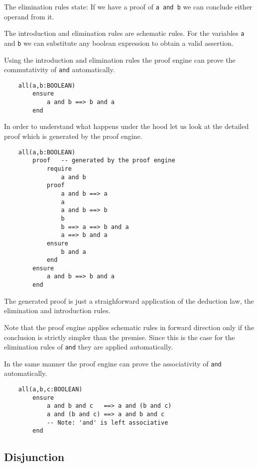 The elimination rules state: If we have a proof of \lstinline!a and b! we can conclude
either operand from it.

The introduction and elimination rules are schematic rules. For the variables
\lstinline!a! and \lstinline!b! we can substitute any boolean expression to obtain a valid
assertion.

Using the introduction and elimination rules the proof engine can prove the
commutativity of \lstinline!and! automatically.

\begin{lstlisting}
    all(a,b:BOOLEAN)
        ensure
            a and b ==> b and a
        end
\end{lstlisting}

In order to understand what happens under the hood let us look at the detailed
proof which is generated by the proof engine.

\begin{lstlisting}
    all(a,b:BOOLEAN)
        proof   -- generated by the proof engine
            require
                a and b
            proof
                a and b ==> a
                a
                a and b ==> b
                b
                b ==> a ==> b and a
                a ==> b and a
            ensure
                b and a
            end
        ensure
            a and b ==> b and a
        end
\end{lstlisting}

The generated proof is just a straighforward application of the deduction law,
the elimination and introduction rules.

Note that the proof engine applies schematic rules in forward direction only
if the conclusion is strictly simpler than the premise. Since this is the case
for the elimination rules of \lstinline!and! they are applied automatically.

In the same manner the proof engine can prove the associativity of
\lstinline!and!  automatically.

\begin{lstlisting}
    all(a,b,c:BOOLEAN)
        ensure
            a and b and c   ==> a and (b and c)
            a and (b and c) ==> a and b and c
            -- Note: 'and' is left associative
        end
\end{lstlisting}



\subsection{Disjunction}

